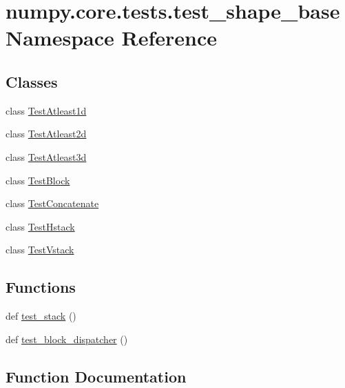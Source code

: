 \hypertarget{namespacenumpy_1_1core_1_1tests_1_1test__shape__base}{}\section{numpy.\+core.\+tests.\+test\+\_\+shape\+\_\+base Namespace Reference}
\label{namespacenumpy_1_1core_1_1tests_1_1test__shape__base}
\subsection*{Classes}
\begin{DoxyCompactItemize}
\item 
class \hyperlink{classnumpy_1_1core_1_1tests_1_1test__shape__base_1_1TestAtleast1d}{Test\+Atleast1d}
\item 
class \hyperlink{classnumpy_1_1core_1_1tests_1_1test__shape__base_1_1TestAtleast2d}{Test\+Atleast2d}
\item 
class \hyperlink{classnumpy_1_1core_1_1tests_1_1test__shape__base_1_1TestAtleast3d}{Test\+Atleast3d}
\item 
class \hyperlink{classnumpy_1_1core_1_1tests_1_1test__shape__base_1_1TestBlock}{Test\+Block}
\item 
class \hyperlink{classnumpy_1_1core_1_1tests_1_1test__shape__base_1_1TestConcatenate}{Test\+Concatenate}
\item 
class \hyperlink{classnumpy_1_1core_1_1tests_1_1test__shape__base_1_1TestHstack}{Test\+Hstack}
\item 
class \hyperlink{classnumpy_1_1core_1_1tests_1_1test__shape__base_1_1TestVstack}{Test\+Vstack}
\end{DoxyCompactItemize}
\subsection*{Functions}
\begin{DoxyCompactItemize}
\item 
def \hyperlink{namespacenumpy_1_1core_1_1tests_1_1test__shape__base_ae3eb99e39fbbeb0a393c9965c291db95}{test\+\_\+stack} ()
\item 
def \hyperlink{namespacenumpy_1_1core_1_1tests_1_1test__shape__base_a145f8d39c1ea01af06e8a2ecfb617449}{test\+\_\+block\+\_\+dispatcher} ()
\end{DoxyCompactItemize}


\subsection{Function Documentation}
\mbox{\label{namespacenumpy_1_1core_1_1tests_1_1test__shape__base_a145f8d39c1ea01af06e8a2ecfb617449}} 
